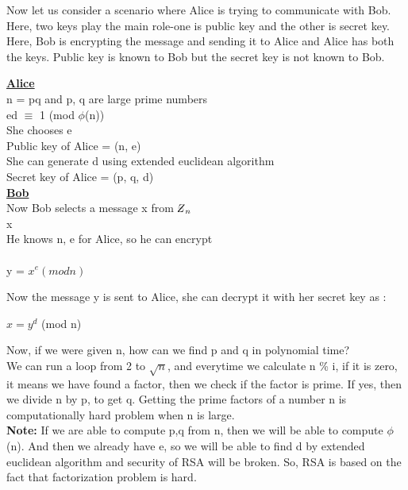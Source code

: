 \documentclass[11pt]{article}
\newcommand{\zbar}{\raisebox{0.2ex}{--}\kern-0.6em Z}
\begin{document}
Now let us consider a scenario where Alice is trying to communicate with Bob. Here, two keys play the main role-one is public key and the other is secret key. Here, Bob is encrypting the message and sending it to Alice and Alice has both the keys. Public key is known to Bob but the secret key is not known to Bob.\\
\begin{center}
    \textbf{\underline{Alice}}\\
n = pq and p, q are large prime numbers\\
ed $\equiv$ 1 (mod $\phi$(n))\\
She chooses e\\
Public key of Alice = (n, e)\\
She can generate d using extended euclidean algorithm\\
Secret key of Alice = (p, q, d)\\
\textbf{\underline{Bob}}\\
Now Bob selects a message x from ${\zbar}_n$\\
x\\
He knows n, e for Alice, so he can encrypt\\\\
y = $x^e (mod n)$\\
\end{center}

\vspace{3mm}
Now the message y is sent to Alice, she can decrypt it with her secret key as :
\begin{center}
    $x = y^d$ (mod n)
\end{center}
Now, if we were given n, how can we find p and q in polynomial time?\\
We can run a loop from 2 to $\sqrt{n}$, and everytime we calculate n \% i, if it is zero, it means we have found a factor, then we check if the factor is prime. If yes, then we divide n by p, to get q. Getting the prime factors of a number n is computationally hard problem when n is large.\\
\textbf{Note:} If we are able to compute p,q from n, then we will be able to compute $\phi$(n). And then we already have e, so we will be able to find d by extended euclidean algorithm and security of RSA will be broken. So, RSA is based on the fact that factorization problem is hard.\\
\end{document}
